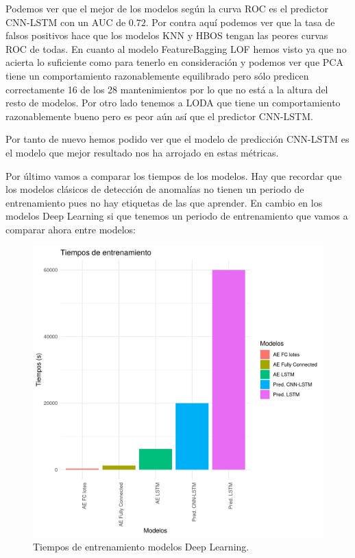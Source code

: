Podemos ver que el mejor de los modelos según la curva ROC es el predictor CNN-LSTM con un AUC de $0.72$. Por contra aquí podemos ver que la tasa de falsos positivos hace que los modelos KNN y HBOS tengan las peores curvas ROC de todas. En cuanto al modelo FeatureBagging LOF hemos visto ya que no acierta lo suficiente como para tenerlo en consideración y podemos ver que PCA tiene un comportamiento razonablemente equilibrado pero sólo predicen correctamente 16 de los 28 mantenimientos por lo que no está a la altura del resto de modelos. Por otro lado tenemos a LODA que tiene un comportamiento razonablemente bueno pero es peor aún así que el predictor CNN-LSTM.

Por tanto de nuevo hemos podido ver que el modelo de predicción CNN-LSTM es el modelo que mejor resultado nos ha arrojado en estas métricas.

Por último vamos a comparar los tiempos de los modelos. Hay que recordar que los modelos clásicos de detección de anomalías no tienen un periodo de entrenamiento pues no hay etiquetas de las que aprender. En cambio en los modelos Deep Learning si que tenemos un periodo de entrenamiento que vamos a comparar ahora entre modelos:

\begin{figure}[H]
	\centering
	\includegraphics[scale=0.65]{imagenes/tiempos_entrenamiento.png}
	\caption{Tiempos de entrenamiento modelos Deep Learning.}
	\label{img:tiempos-entrenamiento}
\end{figure}

